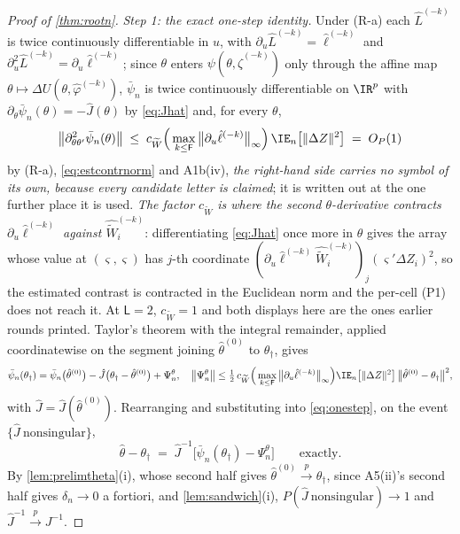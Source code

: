 \begin{proof}[Proof of \cref{thm:rootn}]
\emph{Step 1: the exact one-step identity.} Under (R-a) each $\hat L^{(-k)}$ is twice continuously
differentiable in $u$, with $\partial_u\hat L^{(-k)}=\hat\ell^{(-k)}$ and
$\partial_u^{2}\hat L^{(-k)}=\partial_u\hat\ell^{(-k)}$; since $\theta$ enters
$\psi(\theta,\hat\zeta^{(-k)})$ only through the affine map $\theta\mapsto\Delta U(\theta,\hat\varphi^{(-k)})$,
$\bar\psi_n$ is twice continuously differentiable on $\IR^{p}$ with
$\partial_\theta\bar\psi_n(\theta)=-\hat J(\theta)$ by \eqref{eq:Jhat} and, for every $\theta$,
\[
\big\|\partial^{2}_{\theta\theta'}\bar\psi_n(\theta)\big\|
\;\le\;c_{\widetilde W}\Big(\max_{k\le\mathsf F}\big\|\partial_u\hat\ell^{(-k)}\big\|_\infty\Big)\,\IE_n\big[\|\Delta Z\|^{2}\big]
\;=\;O_P(1)
\]
by (R-a), \eqref{eq:estcontrnorm} and A1b(iv), \emph{the right-hand side carries no symbol of its own,
because every candidate letter is claimed}; it is written out at the one further place it is used.
\emph{The factor $c_{\widetilde W}$ is where the second $\theta$-derivative contracts
$\partial_u\hat\ell^{(-k)}$ against $\widehat{\widetilde W}^{(-k)}_i$}: differentiating \eqref{eq:Jhat}
once more in $\theta$ gives the array whose value at $(\varsigma,\varsigma)$ has $j$-th coordinate
$(\partial_u\hat\ell^{(-k)}\widehat{\widetilde W}^{(-k)}_i)_j(\varsigma'\Delta Z_i)^{2}$, so the estimated
contrast is contracted in the Euclidean norm and the per-cell \textup{(P1)} does not reach it.
At $\mathsf L=2$, $c_{\widetilde W}=1$ and both displays here are the ones earlier rounds printed.
Taylor's theorem with
the integral remainder, applied coordinatewise on the
segment joining $\hat\theta^{(0)}$ to $\theta_\dagger$, gives
\[
\bar\psi_n(\theta_\dagger)=\bar\psi_n\big(\hat\theta^{(0)}\big)-\hat J\big(\theta_\dagger-\hat\theta^{(0)}\big)+\Psi^{\theta}_n,
\quad
\big\|\Psi^{\theta}_n\big\|\le\tfrac12\,c_{\widetilde W}\Big(\max_{k\le\mathsf F}\big\|\partial_u\hat\ell^{(-k)}\big\|_\infty\Big)\IE_n\big[\|\Delta Z\|^{2}\big]\,\big\|\hat\theta^{(0)}-\theta_\dagger\big\|^{2},
\]
with $\hat J=\hat J(\hat\theta^{(0)})$. Rearranging and substituting into \eqref{eq:onestep}, on the event
$\{\hat J\ \text{nonsingular}\}$,
\begin{equation}\label{eq:rootnid}
\hat\theta-\theta_\dagger\;=\;\hat J^{-1}\Big[\bar\psi_n(\theta_\dagger)-\Psi^{\theta}_n\Big]
\qquad\text{exactly.}
\end{equation}
By \cref{lem:prelimtheta}\textup{(i)}, whose second half gives
$\hat\theta^{(0)}\xrightarrow{p}\theta_\dagger$, since A5(ii)'s second half gives $\delta_n\to0$ a
fortiori, and
\cref{lem:sandwich}(i), $P(\hat J\ \text{nonsingular})\to1$ and
$\hat J^{-1}\xrightarrow{p}J^{-1}$.


\end{proof}

